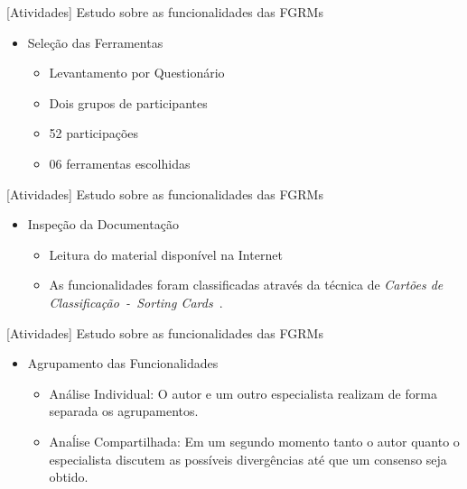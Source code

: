 \documentclass[t,14pt,mathserif]{beamer}
\begin{document}
\begin{frame}{[Atividades] Estudo sobre as funcionalidades das FGRMs}
    \begin{itemize}
        \item Seleção das Ferramentas
            \begin{itemize}
                \item Levantamento por Questionário
                \item Dois grupos de participantes
                \item 52 participações
                \item 06 ferramentas escolhidas
            \end{itemize}
    \end{itemize}
\end{frame}

\begin{frame}{[Atividades] Estudo sobre as funcionalidades das FGRMs}
    \begin{itemize}
        \item Inspeção da Documentação
            \begin{itemize}
                \item Leitura do material disponível na Internet
                \item As funcionalidades foram classificadas através da técnica
                    de \textit{Cartões de Classificação~-~Sorting
                        Cards}~\cite{just2008towards}.
            \end{itemize}
    \end{itemize}
\end{frame}

\begin{frame}{[Atividades] Estudo sobre as funcionalidades das FGRMs}
    \begin{itemize}
        \item Agrupamento das Funcionalidades
            \begin{itemize}
                \item Análise Individual: O autor e um outro especialista
                    realizam de forma separada os agrupamentos.
                \item Anaĺise Compartilhada: Em um segundo momento tanto o autor
                    quanto o es\-pe\-ci\-a\-lis\-ta discutem as possíveis
                    divergências até que um consenso seja obtido.
            \end{itemize}
    \end{itemize}
\end{frame}
\end{document}
